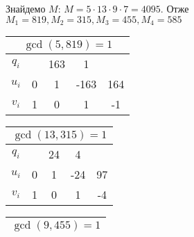 \documentclass[a4paper,12pt]{article}
\newcommand\tab[1][0.5cm]{\hspace*{#1}}
\begin{document}
\begin{justify}
\begin{enumerate}
 			Знайдемо $M$: $M=5\cdot13\cdot9\cdot7=4095$. Отже $M_1=819,M_2=315,M_3=455,M_4=585$
\begin{table}[htp]\centering
\begin{tabular}{ccccc}
\multicolumn{5}{c}{$\gcd(5, 819) = 1$}                                                                                                 \\ \hline
\multicolumn{1}{|c|}{$q_i$} & \multicolumn{1}{c|}{}  & \multicolumn{1}{c|}{163} & \multicolumn{1}{c|}{1}    & \multicolumn{1}{c|}{}    \\ \hline
\multicolumn{1}{|c|}{$u_i$} & \multicolumn{1}{c|}{0} & \multicolumn{1}{c|}{1}   & \multicolumn{1}{c|}{-163} & \multicolumn{1}{c|}{164} \\ \hline
\multicolumn{1}{|c|}{$v_i$} & \multicolumn{1}{c|}{1} & \multicolumn{1}{c|}{0}   & \multicolumn{1}{c|}{1}    & \multicolumn{1}{c|}{-1}  \\ \hline
\end{tabular}\tab\tab
\begin{tabular}{ccccc}
\multicolumn{5}{c}{$\gcd(13, 315) = 1$}                                                                                                                                                                                                  \\ \hline
\multicolumn{1}{|c|}{{$q_i$}} & \multicolumn{1}{c|}{{}} & \multicolumn{1}{c|}{{24}} & \multicolumn{1}{c|}{{4}} & \multicolumn{1}{c|}{}   \\ \hline
\multicolumn{1}{|c|}{$u_i$}                           & \multicolumn{1}{c|}{0}                          & \multicolumn{1}{c|}{1}                            & \multicolumn{1}{c|}{-24}                         & \multicolumn{1}{c|}{97} \\ \hline
\multicolumn{1}{|c|}{$v_i$}                           & \multicolumn{1}{c|}{1}                          & \multicolumn{1}{c|}{0}                            & \multicolumn{1}{c|}{1}                           & \multicolumn{1}{c|}{-4} \\ \hline
\end{tabular}
\end{table}
\begin{table}[htp]\centering
\begin{tabular}{cccccc}
\multicolumn{6}{c}{$\gcd(9, 455) = 1$}                                                                                                                                                                                                                               \\ \hline

\end{tabular}
\end{table}
\end{enumerate}
\end{justify}
\end{document}

